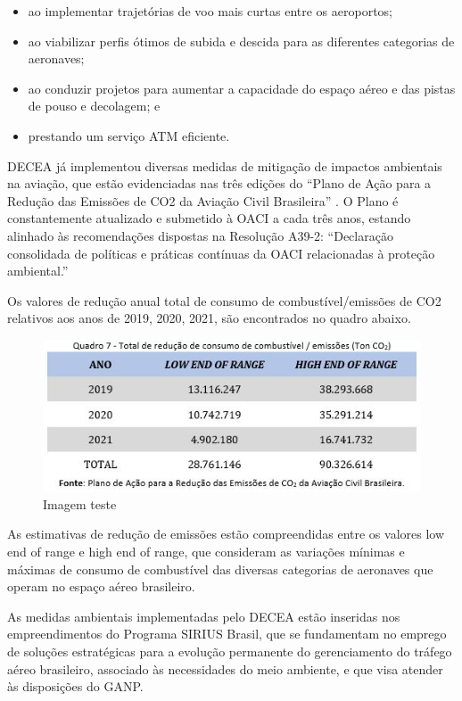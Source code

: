 \documentclass[
]{book}
\providecommand{\tightlist}{%
  \setlength{\itemsep}{0pt}\setlength{\parskip}{0pt}}
\begin{document}
\begin{itemize}
\tightlist
\item
  ao implementar trajetórias de voo mais curtas entre os aeroportos;
\item
  ao viabilizar perfis ótimos de subida e descida para as diferentes categorias de aeronaves;
\item
  ao conduzir projetos para aumentar a capacidade do espaço aéreo e das pistas de pouso e decolagem; e
\item
  prestando um serviço ATM eficiente.
\end{itemize}

DECEA já implementou diversas medidas de mitigação de impactos ambientais na aviação, que estão evidenciadas nas três edições do ``Plano de Ação para a Redução das Emissões de CO2 da Aviação Civil Brasileira'' . O Plano é constantemente atualizado e submetido à OACI a cada três anos, estando alinhado às recomendações dispostas na Resolução A39-2: ``Declaração consolidada de políticas e práticas contínuas da OACI relacionadas à proteção ambiental.''

Os valores de redução anual total de consumo de combustível/emissões de CO2 relativos aos anos de 2019, 2020, 2021, são encontrados no quadro abaixo.

\begin{figure}
\centering
\includegraphics{imagens/fig36.jpg}
\caption{Imagem teste}
\end{figure}

As estimativas de redução de emissões estão compreendidas entre os valores low end of range e high end of range, que consideram as variações mínimas e máximas de consumo de combustível das diversas categorias de aeronaves que operam no espaço aéreo brasileiro.

As medidas ambientais implementadas pelo DECEA estão inseridas nos empreendimentos do Programa SIRIUS Brasil, que se fundamentam no emprego de soluções estratégicas para a evolução permanente do gerenciamento do tráfego aéreo brasileiro, associado às necessidades do meio ambiente, e que visa atender às disposições do GANP.
\end{document}
